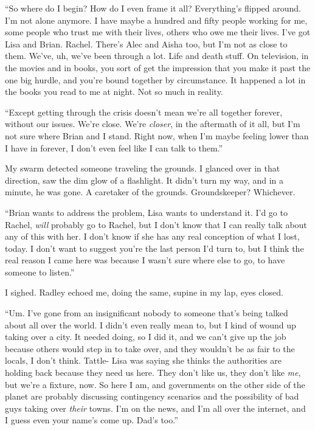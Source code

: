 ``So where do I begin?  How do I even frame it all?  Everything's flipped around.  I'm not alone anymore.  I have maybe a hundred and fifty people working for me, some people who trust me with their lives, others who owe me their lives.  I've got Lisa and Brian.  Rachel.  There's Alec and Aisha too, but I'm not as close to them.  We've, uh, we've been through a lot.  Life and death stuff.  On television, in the movies and in books, you sort of get the impression that you make it past the one big hurdle, and you're bound together by circumstance.  It happened a lot in the books you read to me at night.  Not so much in reality.



``Except getting through the crisis doesn't mean we're all together forever, without our issues.  We're close.  We're \emph{closer}, in the aftermath of it all, but I'm not sure where Brian and I stand.  Right now, when I'm maybe feeling lower than I have in forever, I don't even feel like I can talk to them.''



My swarm detected someone traveling the grounds.  I glanced over in that direction, saw the dim glow of a flashlight.  It didn't turn my way, and in a minute, he was gone.  A caretaker of the grounds.  Groundskeeper?  Whichever.



``Brian wants to address the problem, Lisa wants to understand it.  I'd go to Rachel, \emph{will} probably go to Rachel, but I don't know that I can really talk about any of this with her.  I don't know if she has any real conception of what I lost, today.  I don't want to suggest you're the last person I'd turn to, but I think the real reason I came here was because I wasn't sure where else to go, to have someone to listen.''



I sighed.  Radley echoed me, doing the same, supine in my lap, eyes closed.



``Um.  I've gone from an insignificant nobody to someone that's being talked about all over the world.  I didn't even really mean to, but I kind of wound up taking over a city.  It needed doing, so I did it, and we can't give up the job because others would step in to take over, and they wouldn't be as fair to the locals, I don't think.  Tattle- Lisa was saying she thinks the authorities are holding back because they need us here.  They don't like us, they don't like \emph{me}, but we're a fixture, now.  So here I am, and governments on the other side of the planet are probably discussing contingency scenarios and the possibility of bad guys taking over \emph{their} towns.  I'm on the news, and I'm all over the internet, and I guess even your name's come up.  Dad's too.''



